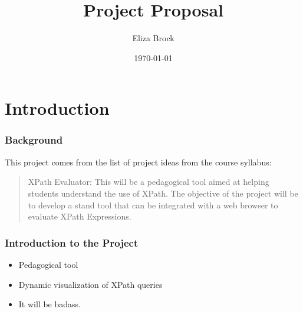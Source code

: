 \documentclass{beamer}
\title{Project Proposal}
\author{Eliza Brock}
\date{\today}
\begin{document}
\begin{frame}
\titlepage
\end{frame}

\section{Introduction}
\begin{frame}
\frametitle{Background}
This project comes from the list of project ideas from the course syllabus:
\begin{quote}
XPath Evaluator: This will be a pedagogical tool aimed at helping students
understand the use of XPath. The objective of the project will be to develop a stand
tool that can be integrated with a web browser to evaluate XPath Expressions.
\end{quote}
\end{frame}


\begin{frame}
\frametitle{Introduction to the Project}
\begin{itemize}
\item Pedagogical tool
\pause
\item Dynamic visualization of XPath queries
\pause
\item It will be badass.
\end{itemize}
\end{frame}
\end{document}
